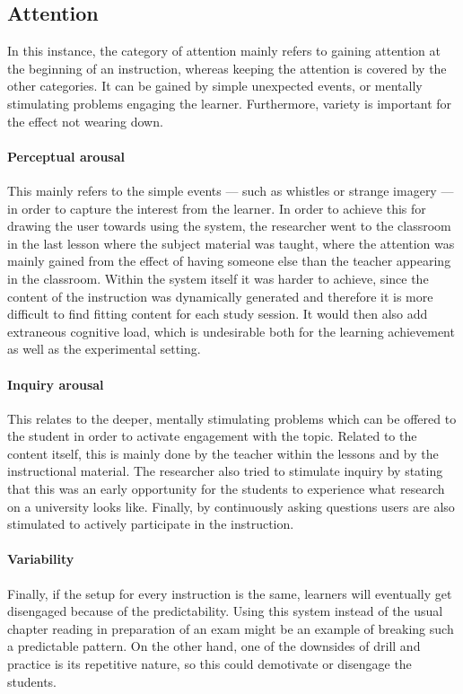         \subsection{Attention}

In this instance, the category of attention mainly refers to gaining attention at the beginning of an instruction, whereas keeping the attention is covered by the other categories. It can be gained by simple unexpected events, or mentally stimulating problems engaging the learner. Furthermore, variety is important for the effect not wearing down.

\paragraph{Perceptual arousal} This mainly refers to the simple events --- such as whistles or strange imagery --- in order to capture the interest from the learner. In order to achieve this for drawing the user towards using the system, the researcher went to the classroom in the last lesson where the subject material was taught, where the attention was mainly gained from the effect of having someone else than the teacher appearing in the classroom. Within the system itself it was harder to achieve, since the content of the instruction was dynamically generated and therefore it is more difficult to find fitting content for each study session. It would then also add extraneous cognitive load, which is undesirable both for the learning achievement as well as the experimental setting.

\paragraph{Inquiry arousal} This relates to the deeper, mentally stimulating problems which can be offered to the student in order to activate engagement with the topic. Related to the content itself, this is mainly done by the teacher within the lessons and by the instructional material. The researcher also tried to stimulate inquiry by stating that this was an early opportunity for the students to experience what research on a university looks like. Finally, by continuously asking questions users are also stimulated to actively participate in the instruction.

\paragraph{Variability} Finally, if the setup for every instruction is the same, learners will eventually get disengaged because of the predictability. Using this system instead of the usual chapter reading in preparation of an exam might be an example of breaking such a predictable pattern. On the other hand, one of the downsides of drill and practice is its repetitive nature, so this could demotivate or disengage the students.

